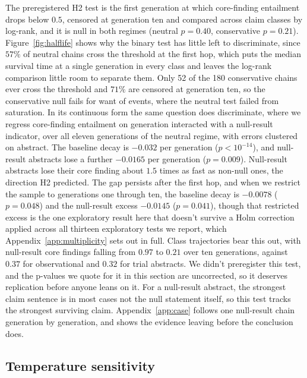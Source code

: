 \documentclass{article}
\begin{document}
The preregistered H2 test is the first generation at which core-finding entailment drops below $0.5$, censored at generation ten and compared across claim classes by log-rank, and it is null in both regimes (neutral $p = 0.40$, conservative $p = 0.21$). Figure~\ref{fig:halflife} shows why the binary test has little left to discriminate, since $57\%$ of neutral chains cross the threshold at the first hop, which puts the median survival time at a single generation in every class and leaves the log-rank comparison little room to separate them. Only 52 of the 180 conservative chains ever cross the threshold and $71\%$ are censored at generation ten, so the conservative null fails for want of events, where the neutral test failed from saturation. In its continuous form the same question does discriminate, where we regress core-finding entailment on generation interacted with a null-result indicator, over all eleven generations of the neutral regime, with errors clustered on abstract. The baseline decay is $-0.032$ per generation ($p < 10^{-14}$), and null-result abstracts lose a further $-0.0165$ per generation ($p = 0.009$). Null-result abstracts lose their core finding about $1.5$ times as fast as non-null ones, the direction H2 predicted. The gap persists after the first hop, and when we restrict the sample to generations one through ten, the baseline decay is $-0.0078$ ($p = 0.048$) and the null-result excess $-0.0145$ ($p = 0.041$), though that restricted excess is the one exploratory result here that doesn't survive a Holm correction applied across all thirteen exploratory tests we report, which Appendix~\ref{app:multiplicity} sets out in full. Class trajectories bear this out, with null-result core findings falling from $0.97$ to $0.21$ over ten generations, against $0.37$ for observational and $0.32$ for trial abstracts. We didn't preregister this test, and the p-values we quote for it in this section are uncorrected, so it deserves replication before anyone leans on it. For a null-result abstract, the strongest claim sentence is in most cases not the null statement itself, so this test tracks the strongest surviving claim. Appendix~\ref{app:case} follows one null-result chain generation by generation, and shows the evidence leaving before the conclusion does.


\subsection{Temperature sensitivity}
\end{document}
